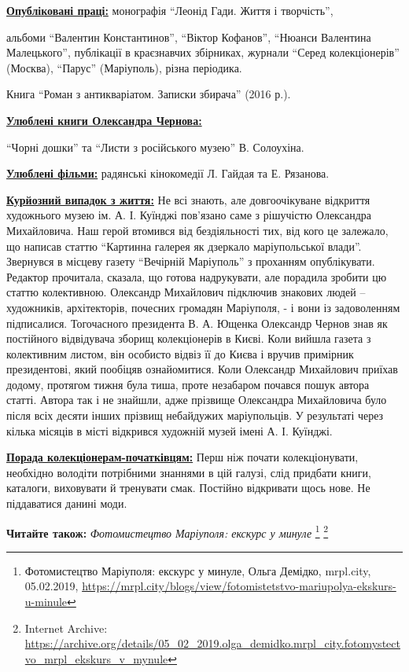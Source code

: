 \underline{\textbf{Опубліковані праці:}} монографія \enquote{Леонід Гади. Життя і творчість},

альбоми \enquote{Валентин Константинов}, \enquote{Віктор Кофанов}, \enquote{Нюанси Валентина Малецького},
публікації в краєзнавчих збірниках, журнали \enquote{Серед колекціонерів}
(Москва), \enquote{Парус} (Маріуполь), різна періодика.


Книга \enquote{Роман з антикваріатом. Записки збирача} (2016 р.).

\underline{\textbf{Улюблені книги Олександра Чернова:}} 

\enquote{Чорні дошки} та \enquote{Листи з російського музею} В. Солоухіна.

\underline{\textbf{Улюблені фільми:}} радянські кінокомедії Л. Гайдая та Е. Рязанова.

\underline{\textbf{Курйозний випадок з життя:}} Не всі знають, але довгоочікуване відкриття
художнього музею ім. А. І. Куїнджі пов'язано саме з рішучістю Олександра
Михайловича. Наш герой втомився від бездіяльності тих, від кого це залежало, що
написав статтю \enquote{Картинна галерея як дзеркало маріупольської влади}.
Звернувся в місцеву газету \enquote{Вечірній Маріуполь} з проханням
опублікувати. Редактор прочитала, сказала, що готова надрукувати, але порадила
зробити цю статтю колективною. Олександр Михайлович підключив знакових людей –
художників, архітекторів, почесних громадян Маріуполя, - і вони із задоволенням
підписалися. Тогочасного президента В. А. Ющенка Олександр Чернов знав як
постійного відвідувача зборищ колекціонерів в Києві. Коли вийшла газета з
колективним листом, він особисто відвіз її до Києва і вручив примірник
президентові, який пообіцяв ознайомитися. Коли Олександр Михайлович приїхав
додому, протягом тижня була тиша, проте незабаром почався пошук автора статті.
Автора так і не знайшли, адже прізвище Олександра Михайловича було після всіх
десяти інших прізвищ небайдужих маріупольців. У результаті через кілька місяців
в місті відкрився художній музей імені А. І. Куїнджі.


\underline{\textbf{Порада колекціонерам-початківцям:}} Перш ніж почати колекціонувати,
необхідно володіти потрібними знаннями в цій галузі, слід придбати книги,
каталоги, виховувати й тренувати смак. Постійно відкривати щось нове. Не
піддаватися данині моди.

\textbf{Читайте також:} \emph{Фотомистецтво Маріуполя: екскурс у минуле}%
\footnote{Фотомистецтво Маріуполя: екскурс у минуле, Ольга Демідко, mrpl.city, 05.02.2019, \url{https://mrpl.city/blogs/view/fotomistetstvo-mariupolya-ekskurs-u-minule} } %
\footnote{Internet Archive: \url{https://archive.org/details/05_02_2019.olga_demidko.mrpl_city.fotomystectvo_mrpl_ekskurs_v_mynule}}
